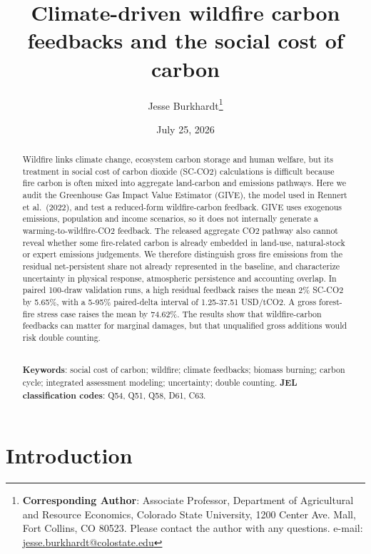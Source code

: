 \documentclass[12pt]{article}
\title{Climate-driven wildfire carbon feedbacks and the social cost of
carbon}
\author{Jesse Burkhardt\footnote{\textbf{Corresponding Author}: Associate Professor, Department of Agricultural and Resource Economics, Colorado State University, 1200 Center Ave. Mall, Fort Collins, CO 80523. Please contact the author with any questions. e-mail: \href{mailto:jesse.burkhardt@colostate.edu}{jesse.burkhardt@colostate.edu}}}
\date{July 25, 2026}
\begin{document}
\maketitle
\thispagestyle{empty}
\hypersetup{pageanchor=false}

\begin{abstract}
Wildfire links climate change, ecosystem carbon storage and human
welfare, but its treatment in social cost of carbon dioxide (SC-CO2)
calculations is difficult because fire carbon is often mixed into
aggregate land-carbon and emissions pathways. Here we audit the
Greenhouse Gas Impact Value Estimator (GIVE), the model used in Rennert
et al.~(2022), and test a reduced-form wildfire-carbon feedback. GIVE
uses exogenous emissions, population and income scenarios, so it does
not internally generate a warming-to-wildfire-CO2 feedback. The released
aggregate CO2 pathway also cannot reveal whether some fire-related
carbon is already embedded in land-use, natural-stock or expert
emissions judgements. We therefore distinguish gross fire emissions from
the residual net-persistent share not already represented in the
baseline, and characterize uncertainty in physical response, atmospheric
persistence and accounting overlap. In paired 100-draw validation runs,
a high residual feedback raises the mean 2\% SC-CO2 by 5.65\%, with a
5-95\% paired-delta interval of 1.25-37.51 USD/tCO2. A gross forest-fire
stress case raises the mean by 74.62\%. The results show that
wildfire-carbon feedbacks can matter for marginal damages, but that
unqualified gross additions would risk double counting.

\noindent
 \\

\noindent \textbf{Keywords}: social cost of carbon; wildfire; climate
feedbacks; biomass burning; carbon cycle; integrated assessment
modeling; uncertainty; double counting.
\newline
\textbf{JEL classification codes}: Q54, Q51, Q58, D61, C63.
\end{abstract}

\newpage
\setcounter{page}{1}
\hypersetup{pageanchor=true}
\renewcommand{\baselinestretch}{1.5} \small \normalsize
\renewcommand{\thefootnote}{\arabic{footnote}}
\setcounter{footnote}{0}

\sloppy

\section{Introduction}\label{introduction}
\end{document}
